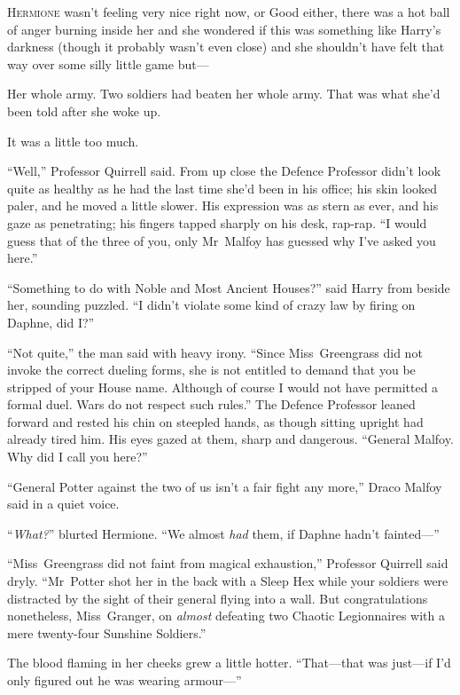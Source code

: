 
\lettrine{H}{ermione} wasn’t
feeling very nice right now, or Good either, there was a hot ball of anger burning inside her and she wondered if this was something like Harry’s darkness (though it probably wasn’t even close) and she shouldn’t have felt that way over some silly little game but—

Her whole army. Two soldiers had beaten her whole army. That was what she’d been told after she woke up.

It was a little too much.

“Well,” Professor Quirrell said. From up close the Defence Professor didn’t look quite as healthy as he had the last time she’d been in his office; his skin looked paler, and he moved a little slower. His expression was as stern as ever, and his gaze as penetrating; his fingers tapped sharply on his desk, rap-rap. “I would guess that of the three of you, only Mr~Malfoy has guessed why I’ve asked you here.”

“Something to do with Noble and Most Ancient Houses?” said Harry from beside her, sounding puzzled. “I didn’t violate some kind of crazy law by firing on Daphne, did I?”

“Not quite,” the man said with heavy irony. “Since Miss~Greengrass did not invoke the correct dueling forms, she is not entitled to demand that you be stripped of your House name. Although of course I would not have permitted a formal duel. Wars do not respect such rules.” The Defence Professor leaned forward and rested his chin on steepled hands, as though sitting upright had already tired him. His eyes gazed at them, sharp and dangerous. “General Malfoy. Why did I call you here?”

“General Potter against the two of us isn’t a fair fight any more,” Draco Malfoy said in a quiet voice.

“\emph{What?}” blurted Hermione. “We almost \emph{had} them, if Daphne hadn’t fainted—”

“Miss~Greengrass did not faint from magical exhaustion,” Professor Quirrell said dryly. “Mr~Potter shot her in the back with a Sleep Hex while your soldiers were distracted by the sight of their general flying into a wall. But congratulations nonetheless, Miss~Granger, on \emph{almost} defeating two Chaotic Legionnaires with a mere twenty-four Sunshine Soldiers.”

The blood flaming in her cheeks grew a little hotter. “That—that was just—if I’d only figured out he was wearing armour—”


